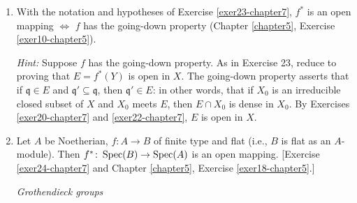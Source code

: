 \begin{enumerate}
    \textit{Hint:} By Exercise \ref{exer20-chapter7} it is enough to take $E = U \cap C$ where $U$ is open and $C$ is closed in $Y$; then, replacing $B$ by a homomorphic image, we reduce to the case where $E$ is open in $Y$. Since $Y$ is Noetherian, $E$ is quasi-compact and therefore a finite union of open sets of the form $\Spec(B_g)$. Hence reduce to the case $E = Y$. To show that $f^*(Y)$ is constructible, use the criterion of Exercise \ref{exer21-chapter7}. Let $X_0$ be an irreducible closed subset of $X$ such that $f^*(Y) \cap X_0$ is dense in $X_0$. We have $f^*(Y) \cap X_0 = f^*(f^{*-1}(X_0))$, and $f^{*-1}(X_0) = \Spec((A/\mathfrak{p}) \otimes_A B)$, where $X_0 = \Spec(A/\mathfrak{p})$. Hence reduce to the case where $A$ is an integral domain and $f$ is injective. If $Y_1, \ldots, Y_n$ are the irreducible components of $Y$, it is enough to show that some $f^*(Y_i)$ contains a non-empty open set in $X$. So finally we are brought down to the situation in which $A$, $B$ are integral domains and $f$ is injective (and still of finite type); now use Chapter \ref{chapter5}, Exercise \ref{exer21-chapter5} to complete the proof.

    \item \label{exer24-chapter7} With the notation and hypotheses of Exercise \ref{exer23-chapter7}, $f^*$ is an open mapping $\iff$ $f$ has the going-down property (Chapter \ref{chapter5}, Exercise \ref{exer10-chapter5}).
    
    \textit{Hint:} Suppose $f$ has the going-down property. As in Exercise 23, reduce to proving that $E = f^*(Y)$ is open in $X$. The going-down property asserts that if $\mathfrak{q} \in E$ and $\mathfrak{q}' \subseteq \mathfrak{q}$, then $\mathfrak{q}' \in E$: in other words, that if $X_0$ is an irreducible closed subset of $X$ and $X_0$ meets $E$, then $E \cap X_0$ is dense in $X_0$. By Exercises \ref{exer20-chapter7} and \ref{exer22-chapter7}, $E$ is open in $X$.

    \item \label{exer25-chapter7} Let $A$ be Noetherian, $f \colon A \to B$ of finite type and flat (i.e., $B$ is flat as an $A$-module). Then $f^* \colon \operatorname{Spec}(B) \to \operatorname{Spec}(A)$ is an open mapping. [Exercise \ref{exer24-chapter7} and Chapter \ref{chapter5}, Exercise \ref{exer18-chapter5}.]

    \textit{Grothendieck groups}


\end{enumerate}
